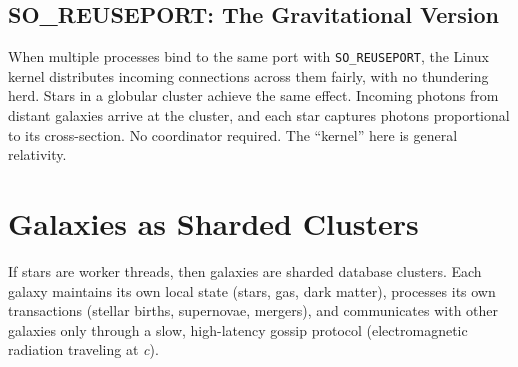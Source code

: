 \documentclass[12pt,a4paper]{article}
\begin{document}
\subsection{SO\_REUSEPORT: The Gravitational Version}

When multiple processes bind to the same port with \texttt{SO\_REUSEPORT}, the
Linux kernel distributes incoming connections across them fairly, with no
thundering herd. Stars in a globular cluster achieve the same effect. Incoming
photons from distant galaxies arrive at the cluster, and each star captures
photons proportional to its cross-section. No coordinator required. The
``kernel'' here is general relativity.

\begin{center}
\end{center}

\section{Galaxies as Sharded Clusters}

If stars are worker threads, then galaxies are sharded database clusters. Each
galaxy maintains its own local state (stars, gas, dark matter), processes its
own transactions (stellar births, supernovae, mergers), and communicates with
other galaxies only through a slow, high-latency gossip protocol
(electromagnetic radiation traveling at \emph{c}).
\end{document}
